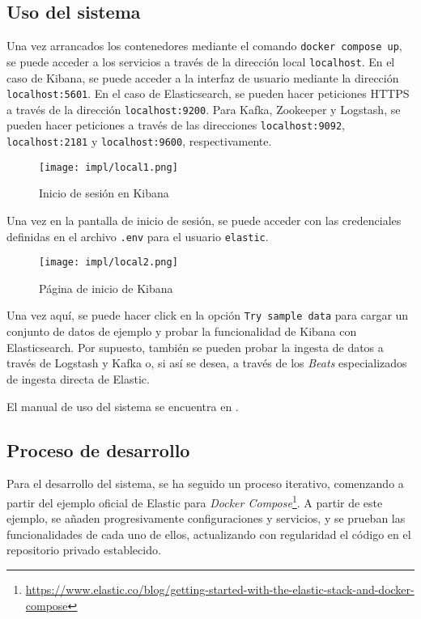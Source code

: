 \newpage{}
\subsection{Uso del sistema}
Una vez arrancados los contenedores mediante el comando
\texttt{docker compose up}, se puede acceder a los servicios a través de la
dirección local \texttt{localhost}. En el caso de Kibana, se puede acceder a
la interfaz de usuario mediante la dirección \texttt{localhost:5601}. En el
caso de Elasticsearch, se pueden hacer peticiones HTTPS a través de la dirección
\texttt{localhost:9200}. Para Kafka, Zookeeper y Logstash, se pueden hacer
peticiones a través de las direcciones \texttt{localhost:9092},
\texttt{localhost:2181} y \texttt{localhost:9600}, respectivamente.

\begin{figure}[H]
	\centering
	\texttt{[image: impl/local1.png]}
	\caption{Inicio de sesión en Kibana}
	\label{fig:kibana_login}
\end{figure}

Una vez en la pantalla de inicio de sesión, se puede acceder con las credenciales
definidas en el archivo \texttt{.env} para el usuario \texttt{elastic}.

\begin{figure}[H]
	\centering
	\texttt{[image: impl/local2.png]}
	\caption{Página de inicio de Kibana}
	\label{fig:kibana_start}
\end{figure}

Una vez aquí, se puede hacer click en la opción \texttt{Try sample data} para
cargar un conjunto de datos de ejemplo y probar la funcionalidad de Kibana con
Elasticsearch. Por supuesto, también se pueden probar la ingesta de datos a
través de Logstash y Kafka o, si así se desea, a través de los \textit{Beats}
especializados de ingesta directa de Elastic.

El manual de uso del sistema se encuentra en .


\newpage{}
\subsection{Proceso de desarrollo}\label{subsec:impl_local_desarrollo}
Para el desarrollo del sistema, se ha seguido un proceso iterativo, comenzando
a partir del ejemplo oficial de Elastic para \textit{Docker Compose}\footnote{
  \url{https://www.elastic.co/blog/getting-started-with-the-elastic-stack-and-docker-compose}
}. A partir de este ejemplo, se añaden progresivamente configuraciones y
servicios, y se prueban las funcionalidades de cada uno de ellos, actualizando
con regularidad el código en el repositorio privado establecido.

